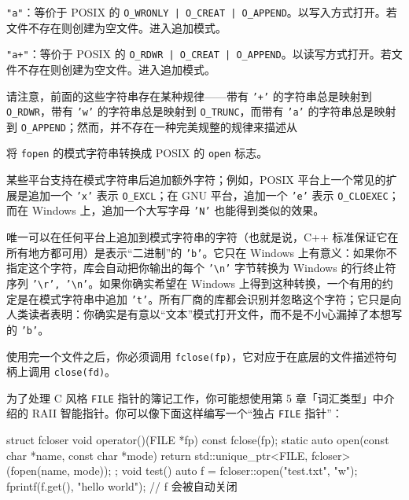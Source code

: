 \texttt{"a"}：等价于 POSIX 的 \texttt{O\_\allowbreak{}WRONLY | O\_\allowbreak{}CREAT | O\_\allowbreak{}APPEND}。以写入方式打开。若文件不存在则创建为空文件。进入追加模式。

\texttt{"a+"}：等价于 POSIX 的 \texttt{O\_\allowbreak{}RDWR | O\_\allowbreak{}CREAT | O\_\allowbreak{}APPEND}。以读写方式打开。若文件不存在则创建为空文件。进入追加模式。

请注意，前面的这些字符串存在某种规律——带有 \texttt{'+'} 的字符串总是映射到 \texttt{O\_\allowbreak{}RDWR}，带有 \texttt{'w'} 的字符串总是映射到 \texttt{O\_\allowbreak{}TRUNC}，而带有 \texttt{'a'} 的字符串总是映射到 \texttt{O\_\allowbreak{}APPEND}；然而，并不存在一种完美规整的规律来描述从

将 \texttt{fopen} 的模式字符串转换成 POSIX 的 \texttt{open} 标志。

某些平台支持在模式字符串后追加额外字符；例如，POSIX 平台上一个常见的扩展是追加一个 \texttt{'x'} 表示 \texttt{O\_\allowbreak{}EXCL}；在 GNU 平台，追加一个 \texttt{'e'} 表示 \texttt{O\_\allowbreak{}CLOEXEC}；而在 Windows 上，追加一个大写字母 \texttt{'N'} 也能得到类似的效果。

唯一可以在任何平台上追加到模式字符串的字符（也就是说，C++ 标准保证它在所有地方都可用）是表示“二进制”的 \texttt{'b'}。它只在 Windows 上有意义：如果你不指定这个字符，库会自动把你输出的每个 \texttt{'\textbackslash n'} 字节转换为 Windows 的行终止符序列 \texttt{'\textbackslash r',\allowbreak{} '\textbackslash n'}。如果你确实希望在 Windows 上得到这种转换，一个有用的约定是在模式字符串中追加 \texttt{'t'}。所有厂商的库都会识别并忽略这个字符；它只是向人类读者表明：你确实是有意以“文本”模式打开文件，而不是不小心漏掉了本想写的 \texttt{'b'}。

使用完一个文件之后，你必须调用 \texttt{fclose(\allowbreak{}fp)\allowbreak{}}，它对应于在底层的文件描述符句柄上调用 \texttt{close(\allowbreak{}fd)\allowbreak{}}。

为了处理 C 风格 \texttt{FILE} 指针的簿记工作，你可能想使用第 5 章「词汇类型」中介绍的 RAII 智能指针。你可以像下面这样编写一个“独占 \texttt{FILE} 指针”：

\begin{codebox}[cpp]
    struct fcloser {
      void operator()(FILE *fp) const {
        fclose(fp);
      }
      static auto open(const char *name, const char *mode) {
        return std::unique_ptr<FILE, fcloser>(fopen(name, mode));
      }
    };
    void test() {
      auto f = fcloser::open("test.txt", "w");
      fprintf(f.get(), "hello world\n");
        // f 会被自动关闭
    }
\end{codebox}

